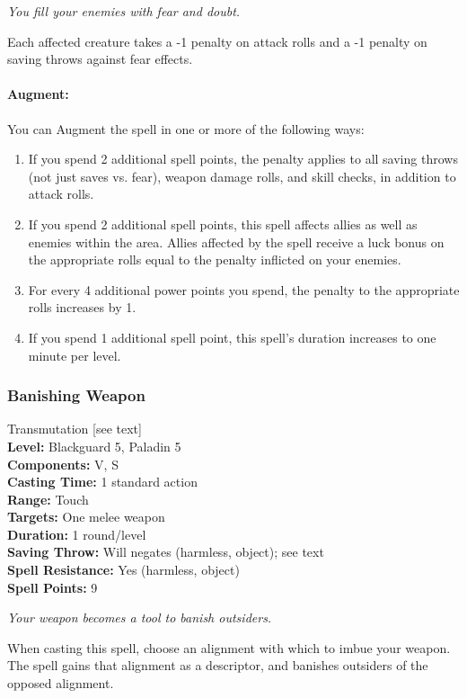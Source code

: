 \emph{You fill your enemies with fear and doubt.}

Each affected creature takes a -1 penalty on attack rolls and a -1 penalty on saving throws against fear effects.

\paragraph{Augment:} You can Augment the spell in one or more of the following ways:
\begin{enumerate}
 \item If you spend 2 additional spell points, the penalty applies to all saving throws (not just saves vs. fear), weapon damage rolls, and skill checks, in addition to attack rolls.
 \item If you spend 2 additional spell points, this spell affects allies as well as enemies within the area.
 Allies affected by the spell receive a luck bonus on the appropriate rolls equal to the penalty inflicted on your enemies.
 \item For every 4 additional power points you spend, the penalty to the appropriate rolls increases by 1.
 \item If you spend 1 additional spell point, this spell's duration increases to one minute per level.
\end{enumerate}
\subsubsection{Banishing Weapon}
\label{Spell:BanishingWeapon}
Transmutation [see text]
\\ \textbf{Level:} Blackguard 5, Paladin 5
\\ \textbf{Components:} V, S
\\ \textbf{Casting Time:} 1 standard action
\\ \textbf{Range:} Touch
\\ \textbf{Targets:} One melee weapon
\\ \textbf{Duration:} 1 round/level
\\ \textbf{Saving Throw:} Will negates (harmless, object); see text
\\ \textbf{Spell Resistance:} Yes (harmless, object)
\\ \textbf{Spell Points:} 9

\emph{Your weapon becomes a tool to banish outsiders.}

When casting this spell, choose an alignment with which to imbue your weapon. The spell gains that alignment as a descriptor, and banishes outsiders of the opposed alignment.


